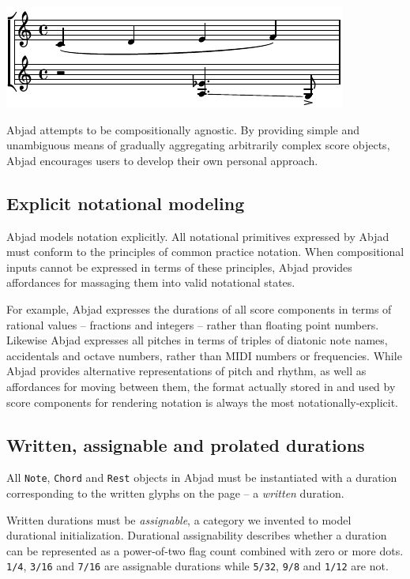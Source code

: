 \includegraphics[scale=1.0]{images/section_2_notational_isomorphism-2.pdf}


Abjad attempts to be compositionally agnostic. By providing simple and
unambiguous means of gradually aggregating arbitrarily complex score objects,
Abjad encourages users to develop their own personal approach.

\subsection{Explicit notational modeling}

Abjad models notation explicitly. All notational primitives expressed by Abjad
must conform to the principles of common practice notation. When compositional
inputs cannot be expressed in terms of these principles, Abjad provides
affordances for massaging them into valid notational states.

For example, Abjad expresses the durations of all score components in terms of
rational values -- fractions and integers -- rather than floating point
numbers. Likewise Abjad expresses all pitches in terms of triples of diatonic
note names, accidentals and octave numbers, rather than MIDI numbers or
frequencies. While Abjad provides alternative representations of pitch and
rhythm, as well as affordances for moving between them, the format actually
stored in and used by score components for rendering notation is always the
most notationally-explicit.

\subsection{Written, assignable and prolated durations}

All \texttt{Note}, \texttt{Chord} and \texttt{Rest} objects in Abjad must be
instantiated with a duration corresponding to the written glyphs on the page --
a \emph{written} duration.

Written durations must be \emph{assignable}, a category we invented to model
durational initialization. Durational assignability describes whether a
duration can be represented as a power-of-two flag count combined with zero or
more dots. \texttt{1/4}, \texttt{3/16} and \texttt{7/16} are assignable
durations while \texttt{5/32}, \texttt{9/8} and \texttt{1/12} are not.

